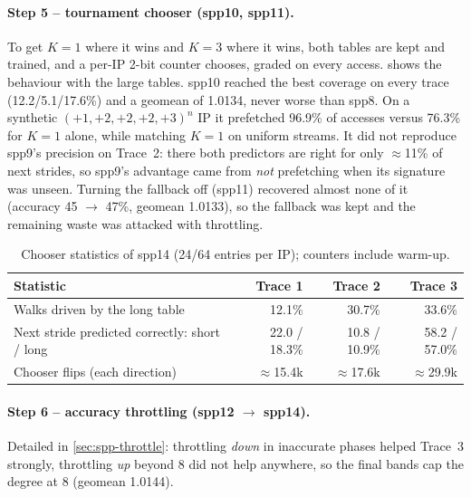 \documentclass[12pt, a4paper]{article}
\newcommand{\tablesetup}{\small\renewcommand{\arraystretch}{1.15}\setlength{\tabcolsep}{4pt}}
\newcommand{\colhead}[1]{\textbf{#1}}
\begin{document}
\paragraph{Step 5 -- tournament chooser (spp10, spp11).} To get $K=1$ where it
wins and $K=3$ where it wins, both tables are kept and trained, and a per-IP
2-bit counter chooses, graded on every access.  shows the
behaviour with the large tables. spp10 reached the best coverage on every trace
(12.2/5.1/17.6\%) and a geomean of 1.0134, never worse than spp8. On a
synthetic $(+1,+2,+2,+2,+3)^n$ IP it prefetched 96.9\% of accesses versus
76.3\% for $K=1$ alone, while matching $K=1$ on uniform streams. It did not
reproduce spp9's precision on Trace~2: there both predictors are right for only
$\approx$11\% of next strides, so spp9's advantage came from \emph{not}
prefetching when its signature was unseen. Turning the fallback off (spp11)
recovered almost none of it (accuracy 45 $\to$ 47\%, geomean 1.0133), so the
fallback was kept and the remaining waste was attacked with throttling.

\begin{table}[htbp]
\centering
\caption{Chooser statistics of spp14 (24/64 entries per IP); counters include warm-up.}\label{tab:chooser}
\tablesetup
\begin{tabular}{lrrr}
\toprule
\rowcolor{tablehead}\colhead{Statistic} & \colhead{Trace 1} & \colhead{Trace 2} & \colhead{Trace 3} \\
\midrule
Walks driven by the long table & 12.1\% & 30.7\% & 33.6\% \\
Next stride predicted correctly: short / long & 22.0 / 18.3\% & 10.8 / 10.9\% & 58.2 / 57.0\% \\
Chooser flips (each direction) & $\approx$15.4k & $\approx$17.6k & $\approx$29.9k \\
\bottomrule
\end{tabular}
\end{table}

\paragraph{Step 6 -- accuracy throttling (spp12 $\to$ spp14).} Detailed in
\cref{sec:spp-throttle}: throttling \emph{down} in inaccurate phases helped
Trace~3 strongly, throttling \emph{up} beyond 8 did not help anywhere, so the
final bands cap the degree at 8 (geomean 1.0144).
\end{document}
